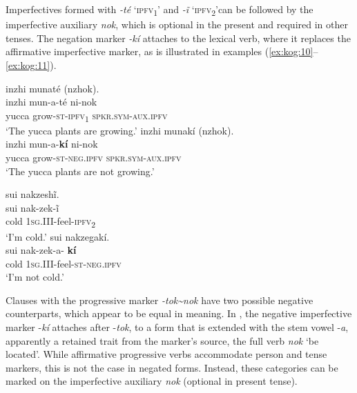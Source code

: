\documentclass[output=paper,colorlinks,citecolor=brown]{langscibook}
\begin{document}
Imperfectives formed with \textit{{}-t\'{e}} ‘\textsc{ipfv}\textsc{\textsubscript{1}}’ and \textit{{}-ĩ} ‘\textsc{ipfv}\textsc{\textsubscript{2}}’can be followed by the imperfective auxiliary \textit{nok}, which is optional in the present and required in other tenses. The negation marker \textit{{}-kí} attaches to the lexical verb, where it replaces the affirmative imperfective marker, as is illustrated in examples (\ref{ex:kog:10}--\ref{ex:kog:11}).

\ea\label{ex:kog:10}
    \ea\label{ex:kog:10a} inzhi munaté (nzhok).\\
        \gll   inzhi mun-a-té ni-nok\\ 
              yucca grow{}-\textsc{st{}-ipfv}\textsc{\textsubscript{1}} \textsc{spkr.sym-aux.ipfv}\\
        \glt ‘The yucca plants are growing.’
    \ex\label{ex:kog:10b}inzhi munakí (nzhok).\\
        \gll  inzhi mun{}-a-\textbf{kí} ni-nok\\
              yucca grow{}-\textsc{st{}-neg.ipfv} \textsc{spkr.sym-aux.ipfv}\\
        \glt  ‘The yucca plants are not growing.’
    \z
\z 

\ea\label{ex:kog:11}
    \ea\label{ex:kog:11a}sui nakzeshĩ.\\
        \gll  sui nak-zek-ĩ\\ 
              cold \textsc{1sg.III{}-}feel-\textsc{ipfv}\textsc{\textsubscript{2}}\\
        \glt ‘I'm cold.’
    \ex\label{ex:kog:11b}sui nakzegakí.\\
        \gll  sui nak-zek{}-a-\textbf{
        kí}\\
               cold \textsc{1sg.III{}-}feel{}-\textsc{st}{}-\textsc{neg.ipfv}\\
        \glt  ‘I'm not cold.’
    \z
\z 

Clauses with the progressive marker \textit{{}-tok{\textasciitilde}nok} have two possible negative counterparts, which appear to be equal in meaning. In , the negative imperfective marker -\textit{kí} attaches after -\textit{tok}, to a form that is extended with the stem vowel {}-\textit{a}, apparently a retained trait from the marker's source, the full verb \textit{nok} ‘be located’. While affirmative progressive verbs accommodate person and tense markers, this is not the case in negated forms. Instead, these categories can be marked on the imperfective auxiliary \textit{nok} (optional in present tense).
\end{document}
